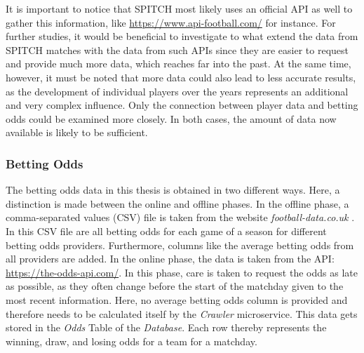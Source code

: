 It is important to notice that SPITCH most likely uses an official API as well to gather this information, like \underline{https://www.api-football.com/} for instance. For further studies, it would be beneficial to investigate to what extend the data from SPITCH matches with the data from such APIs since they are easier to request and provide much more data, which reaches far into the past. At the same time, however, it must be noted that more data could also lead to less accurate results, as the development of individual players over the years represents an additional and very complex influence. Only the connection between player data and betting odds could be examined more closely. In both cases, the amount of data now available is likely to be sufficient.

\subsubsection{Betting Odds}

The betting odds data in this thesis is obtained in two different ways. Here, a distinction is made between the online and offline phases. In the offline phase, a comma-separated values (CSV) file is taken from the website \emph{football-data.co.uk} \parencite[][]{football-data_germany_2021}. In this CSV file are all betting odds for each game of a season for different betting odds providers. Furthermore, columns like the average betting odds from all providers are added. In the online phase, the data is taken from the API: \underline{https://the-odds-api.com/}. In this phase, care is taken to request the odds as late as possible, as they often change before the start of the matchday given to the most recent information. Here, no average betting odds column is provided and therefore needs to be calculated itself by the \emph{Crawler} microservice. This data gets stored in the \emph{Odds} Table of the \emph{Database}. Each row thereby represents the winning, draw, and losing odds for a team for a matchday.

